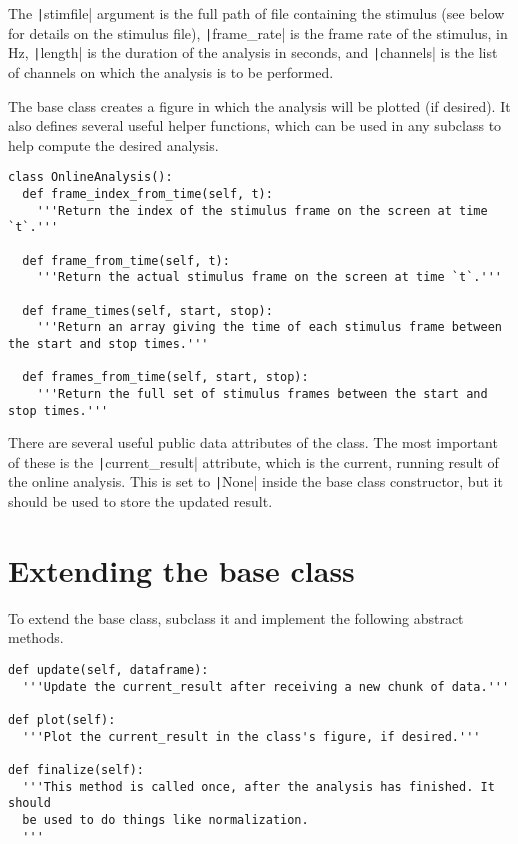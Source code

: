 \documentclass[12pt]{article}
\begin{document}
The \texttt|stimfile| argument is the full path of file containing the stimulus
(see below for details on the stimulus file), \texttt|frame_rate| is the frame
rate of the stimulus, in Hz, \texttt|length| is the duration of the analysis in
seconds, and \texttt|channels| is the list of channels on which the analysis is
to be performed.

The base class creates a figure in which the analysis will be plotted (if desired).
It also defines several useful helper functions, which can be used in any subclass
to help compute the desired analysis.

\begin{verbatim}
class OnlineAnalysis():
  def frame_index_from_time(self, t):
    '''Return the index of the stimulus frame on the screen at time `t`.'''

  def frame_from_time(self, t):
    '''Return the actual stimulus frame on the screen at time `t`.'''

  def frame_times(self, start, stop):
    '''Return an array giving the time of each stimulus frame between the start and stop times.'''

  def frames_from_time(self, start, stop):
    '''Return the full set of stimulus frames between the start and stop times.'''
\end{verbatim}

There are several useful public data attributes of the class. The most important of
these is the \texttt|current_result| attribute, which is the current, running result
of the online analysis. This is set to \texttt|None| inside the base
class constructor, but it should be used to store the updated result.

\section*{Extending the base class}

To extend the base class, subclass it and implement the following abstract methods.

\begin{verbatim}
def update(self, dataframe):
  '''Update the current_result after receiving a new chunk of data.'''

def plot(self):
  '''Plot the current_result in the class's figure, if desired.'''

def finalize(self):
  '''This method is called once, after the analysis has finished. It should
  be used to do things like normalization.
  '''
\end{verbatim}
\end{document}
